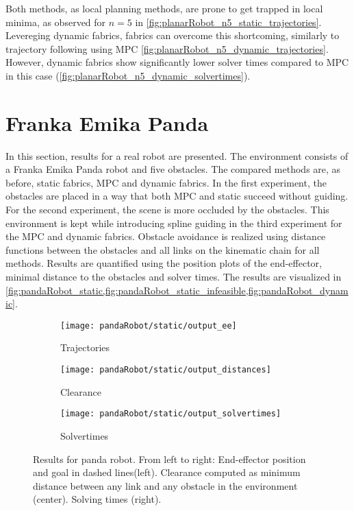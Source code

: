 Both methods, as local planning methods, are prone to get trapped in local minima, as
observed for $n=5$ in \cref{fig:planarRobot_n5_static_trajectories}.
Levereging dynamic fabrics, fabrics can overcome this shortcoming, similarly to trajectory
following using MPC \cref{fig:planarRobot_n5_dynamic_trajectories}. However, dynamic
fabrics show significantly lower solver times compared to MPC in this case
(\cref{fig:planarRobot_n5_dynamic_solvertimes}).

\section{Franka Emika Panda}
In this section, results for a real robot are presented. The environment consists of a
Franka Emika Panda robot and five obstacles. The compared methods are, as before, static
fabrics, MPC and dynamic fabrics. In the first experiment, the obstacles are placed in a
way that both MPC and static succeed without guiding. For the second experiment, the scene
is more occluded by the obstacles. This environment is kept while introducing spline
guiding in the third experiment for the MPC and dynamic fabrics. Obstacle avoidance is
realized using distance functions between the obstacles and all links on the kinematic
chain for all methods. Results are quantified using the position plots of the
end-effector, minimal distance to the obstacles and solver times.
The results are visualized in
\cref{fig:pandaRobot_static,fig:pandaRobot_static_infeasible,fig:pandaRobot_dynamic}.

\begin{figure}
  \begin{subfigure}[]{0.3\textwidth}
  \begin{center}
    \texttt{[image: pandaRobot/static/output\_ee]}
  \end{center}
  \caption{Trajectories}
  \label{fig:pandaRobot_static_trajectories}
  \end{subfigure}%
  \begin{subfigure}[]{0.3\textwidth}
  \begin{center}
    \texttt{[image: pandaRobot/static/output\_distances]}
  \end{center}
  \caption{Clearance}
  \label{fig:pandaRobot_static_distances}
  \end{subfigure}%
  \begin{subfigure}[]{0.3\textwidth}
  \begin{center}
    \texttt{[image: pandaRobot/static/output\_solvertimes]}
  \end{center}
  \caption{Solvertimes}
  \label{fig:pandaRobot_static_solvertimes}
  \end{subfigure}
  \caption{Results for panda robot. From left to right: End-effector position and goal in
dashed lines(left). Clearance computed as minimum distance between any link and any
obstacle in the environment (center). Solving times (right).
}%
  \label{fig:pandaRobot_static}
\end{figure}

